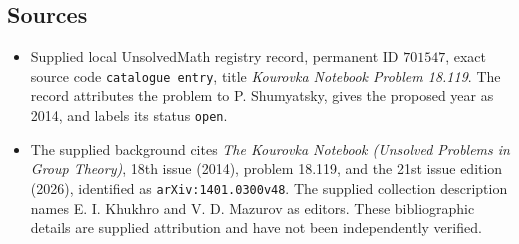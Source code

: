 \documentclass[11pt]{article}
\begin{document}
\subsection{Sources}
\begin{itemize}
\item Supplied local UnsolvedMath registry record, permanent ID \(701547\), exact source code \texttt{catalogue entry}, title \emph{Kourovka Notebook Problem 18.119}. The record attributes the problem to P. Shumyatsky, gives the proposed year as 2014, and labels its status \texttt{open}.
\item The supplied background cites \emph{The Kourovka Notebook (Unsolved Problems in Group Theory)}, 18th issue (2014), problem 18.119, and the 21st issue edition (2026), identified as \texttt{arXiv:1401.0300v48}. The supplied collection description names E. I. Khukhro and V. D. Mazurov as editors. These bibliographic details are supplied attribution and have not been independently verified.
\end{itemize}
\end{document}
